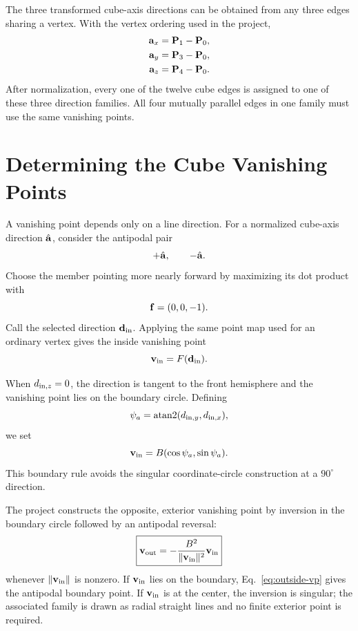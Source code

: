The three transformed cube-axis directions can be obtained from any three edges sharing a vertex.  With the vertex ordering used in the project,
\begin{align}
  \vb a_x&=\vb P_1-\vb P_0,\\
  \vb a_y&=\vb P_3-\vb P_0,\\
  \vb a_z&=\vb P_4-\vb P_0.
  \label{eq:cube-axis-directions}
\end{align}
After normalization, every one of the twelve cube edges is assigned to one of these three direction families.  All four mutually parallel edges in one family must use the same vanishing points.

\section{Determining the Cube Vanishing Points}
A vanishing point depends only on a line direction.  For a normalized cube-axis direction $\hat{\vb a}$, consider the antipodal pair
\begin{equation}
  +\hat{\vb a},
  \qquad
  -\hat{\vb a}.
\end{equation}
Choose the member pointing more nearly forward by maximizing its dot product with
\begin{equation}
  \vb f=(0,0,-1).
\end{equation}
Call the selected direction $\vb d_{\rm in}$.  Applying the same point map used for an ordinary vertex gives the inside vanishing point
\begin{equation}
  \vb v_{\rm in}=F(\vb d_{\rm in}).
  \label{eq:inside-vp}
\end{equation}

When $d_{{\rm in},z}=0$, the direction is tangent to the front hemisphere and the vanishing point lies on the boundary circle.  Defining
\begin{equation}
  \psi_a=\operatorname{atan2}
  (d_{{\rm in},y},d_{{\rm in},x}),
\end{equation}
we set
\begin{equation}
  \vb v_{\rm in}=B(\cos\psi_a,\sin\psi_a).
  \label{eq:boundary-vp}
\end{equation}
This boundary rule avoids the singular coordinate-circle construction at a $90^\circ$ direction.

The project constructs the opposite, exterior vanishing point by inversion in the boundary circle followed by an antipodal reversal:
\begin{equation}
  \boxed{
  \vb v_{\rm out}
  =-\frac{B^2}{\lVert\vb v_{\rm in}\rVert^2}
  \vb v_{\rm in}}
  \label{eq:outside-vp}
\end{equation}
whenever $\lVert\vb v_{\rm in}\rVert$ is nonzero.  If $\vb v_{\rm in}$ lies on the boundary, Eq.~\eqref{eq:outside-vp} gives the antipodal boundary point.  If $\vb v_{\rm in}$ is at the center, the inversion is singular; the associated family is drawn as radial straight lines and no finite exterior point is required.

